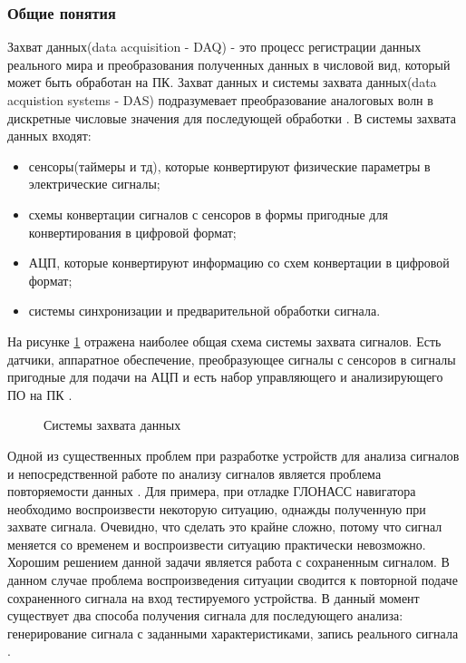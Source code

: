 \subsubsection*{Общие понятия}
Захват данных(data acquisition - DAQ) - это процесс регистрации данных реального мира и преобразования полученных данных в 
числовой вид, который может быть обработан на ПК. Захват данных и системы захвата данных(data acquistion systems - DAS) подразумевает
преобразование аналоговых волн в дискретные числовые значения для последующей обработки \cite{ni_acq}. В системы захвата данных входят:

\begin{itemize}
\item сенсоры(таймеры и тд), которые конвертируют физические параметры в электрические сигналы;
\item схемы конвертации сигналов с сенсоров в формы пригодные для конвертирования в цифровой формат;
\item АЦП, которые конвертируют информацию со схем конвертации в цифровой формат;
\item системы синхронизации и предварительной обработки сигнала.
\end{itemize}

На рисунке \ref{pic:acq} отражена наиболее общая схема системы захвата сигналов. Есть датчики, аппаратное обеспечение,
преобразующее сигналы с сенсоров в сигналы пригодные для подачи на АЦП и есть набор управляющего и анализирующего ПО
на ПК \cite{ni_acq}.

\begin{figure}[H]
\caption{Системы захвата данных}
\label{pic:acq}
\end{figure}

Одной из существенных проблем при разработке устройств для анализа сигналов и непосредственной работе по анализу сигналов
является проблема повторяемости данных \cite{ni_article}. Для примера, при отладке ГЛОНАСС навигатора необходимо 
воспроизвести некоторую ситуацию, однажды полученную при захвате сигнала. Очевидно, что сделать это крайне сложно, потому
что сигнал меняется со временем и воспроизвести ситуацию практически невозможно. Хорошим решением данной задачи является
работа с сохраненным сигналом. В данном случае проблема воспроизведения ситуации сводится к повторной подаче сохраненного
сигнала на вход тестируемого устройства. В данный момент существует два способа получения сигнала для последующего анализа:
генерирование сигнала с заданными характеристиками, запись реального сигнала \cite{ni_article}.


